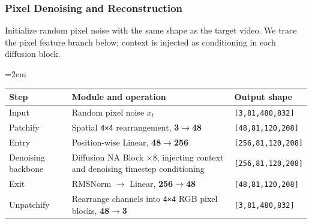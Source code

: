 \documentclass[
  11pt,
  a4paper,
]{article}
\newcounter{none} %
\newcommand{\NotesTableStyle}{\linespread{1}\fontsize{9.5pt}{13pt}\selectfont\setlength{\tabcolsep}{4pt}\renewcommand{\arraystretch}{1.1}\setlength{\extrarowheight}{5pt}\setlength{\LTpre}{5pt}\setlength{\LTpost}{6pt}\setlength{\parskip}{0pt}\emergencystretch=2em}
\begin{document}
\clearpage

\subsubsection{Pixel Denoising and
Reconstruction}\label{ltx25-pixel-decode}

Initialize random pixel noise with the same shape as the target video.
We trace the pixel feature branch below; context is injected as
conditioning in each diffusion block.

\begingroup\NotesTableStyle\fontsize{10pt}{12pt}\selectfont\renewcommand{\arraystretch}{1.02}\setlength{\extrarowheight}{1pt}

{\def\LTcaptype{none} %
\begin{longtable}[]{@{}
  >{\raggedright\arraybackslash}p{}
  >{\raggedright\arraybackslash}p{}
  >{\raggedright\arraybackslash}p{}@{}}
\toprule\noalign{}
\begin{minipage}[b]{\linewidth}\raggedright
Step
\end{minipage} & \begin{minipage}[b]{\linewidth}\raggedright
Module and operation
\end{minipage} & \begin{minipage}[b]{\linewidth}\raggedright
Output shape
\end{minipage} \\
\midrule\noalign{}
\endhead
\bottomrule\noalign{}
\endlastfoot
Input & Random pixel noise \(x_t\) & \texttt{{[}3,81,480,832{]}} \\
Patchify & Spatial \texttt{4×4} rearrangement,
\textbf{3\(\rightarrow\)48} & \texttt{{[}48,81,120,208{]}} \\
Entry & Position-wise Linear, \textbf{48\(\rightarrow\)256} &
\texttt{{[}256,81,120,208{]}} \\
Denoising backbone & Diffusion NA Block ×8, injecting context and
denoising timestep conditioning & \texttt{{[}256,81,120,208{]}} \\
Exit & RMSNorm \(\rightarrow\) Linear, \textbf{256\(\rightarrow\)48} &
\texttt{{[}48,81,120,208{]}} \\
Unpatchify & Rearrange channels into \texttt{4×4} RGB pixel blocks,
\textbf{48\(\rightarrow\)3} & \texttt{{[}3,81,480,832{]}} \\
\end{longtable}
}
\end{document}
